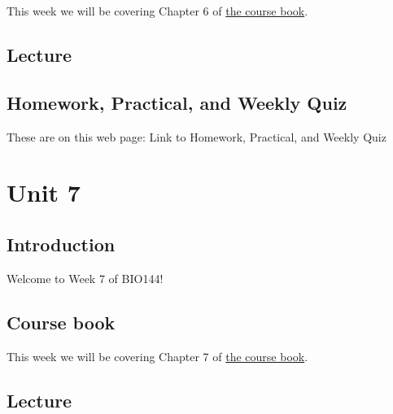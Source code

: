 \documentclass[
  letterpaper,
  8pt,
  a4paper]{book}
\begin{document}

This week we will be covering Chapter 6 of
\href{https://opetchey.github.io/BIO144_Course_Book/}{the course book}.

\section*{Lecture}\label{lecture-5}


\section*{Homework, Practical, and Weekly
Quiz}\label{homework-practical-and-weekly-quiz-5}


These are on this web page: Link to Homework, Practical, and Weekly Quiz


\chapter*{Unit 7}\label{unit-7}


\section*{Introduction}\label{introduction-7}


Welcome to Week 7 of BIO144!

\section*{Course book}\label{course-book-6}


This week we will be covering Chapter 7 of
\href{https://opetchey.github.io/BIO144_Course_Book/}{the course book}.

\section*{Lecture}\label{lecture-6}
\end{document}
